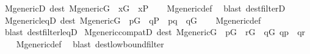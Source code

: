 \begin{isabellebody}
\isanewline
{}\isamarkupfalse%
\ M{\isacharunderscore}{\kern0pt}genericD\ {\isacharbrackleft}{\kern0pt}dest{\isacharbrackright}{\kern0pt}{\isacharcolon}{\kern0pt}\ {\isachardoublequoteopen}M{\isacharunderscore}{\kern0pt}generic{\isacharparenleft}{\kern0pt}G{\isacharparenright}{\kern0pt}\ {\isasymLongrightarrow}\ x{\isasymin}G\ {\isasymLongrightarrow}\ x{\isasymin}P{\isachardoublequoteclose}\isanewline
%
\isadelimproof
\ \ %
\endisadelimproof
%
\isatagproof
{}\isamarkupfalse%
\ M{\isacharunderscore}{\kern0pt}generic{\isacharunderscore}{\kern0pt}def\ \isamarkupfalse%
\ {\isacharparenleft}{\kern0pt}blast\ dest{\isacharcolon}{\kern0pt}filterD{\isacharparenright}{\kern0pt}%
\endisatagproof
{\isafoldproof}%
%
\isadelimproof
\isanewline
%
\endisadelimproof
\isanewline
{}\isamarkupfalse%
\ M{\isacharunderscore}{\kern0pt}generic{\isacharunderscore}{\kern0pt}leqD\ {\isacharbrackleft}{\kern0pt}dest{\isacharbrackright}{\kern0pt}{\isacharcolon}{\kern0pt}\ {\isachardoublequoteopen}M{\isacharunderscore}{\kern0pt}generic{\isacharparenleft}{\kern0pt}G{\isacharparenright}{\kern0pt}\ {\isasymLongrightarrow}\ p{\isasymin}G\ {\isasymLongrightarrow}\ q{\isasymin}P\ {\isasymLongrightarrow}\ p{\isasympreceq}q\ {\isasymLongrightarrow}\ q{\isasymin}G{\isachardoublequoteclose}\isanewline
%
\isadelimproof
\ \ %
\endisadelimproof
%
\isatagproof
{}\isamarkupfalse%
\ M{\isacharunderscore}{\kern0pt}generic{\isacharunderscore}{\kern0pt}def\ \isamarkupfalse%
\ {\isacharparenleft}{\kern0pt}blast\ dest{\isacharcolon}{\kern0pt}filter{\isacharunderscore}{\kern0pt}leqD{\isacharparenright}{\kern0pt}%
\endisatagproof
{\isafoldproof}%
%
\isadelimproof
\isanewline
%
\endisadelimproof
\isanewline
{}\isamarkupfalse%
\ M{\isacharunderscore}{\kern0pt}generic{\isacharunderscore}{\kern0pt}compatD\ {\isacharbrackleft}{\kern0pt}dest{\isacharbrackright}{\kern0pt}{\isacharcolon}{\kern0pt}\ {\isachardoublequoteopen}M{\isacharunderscore}{\kern0pt}generic{\isacharparenleft}{\kern0pt}G{\isacharparenright}{\kern0pt}\ {\isasymLongrightarrow}\ p{\isasymin}G\ {\isasymLongrightarrow}\ r{\isasymin}G\ {\isasymLongrightarrow}\ {\isasymexists}q{\isasymin}G{\isachardot}{\kern0pt}\ q{\isasympreceq}p\ {\isasymand}\ q{\isasympreceq}r{\isachardoublequoteclose}\isanewline
%
\isadelimproof
\ \ %
\endisadelimproof
%
\isatagproof
{}\isamarkupfalse%
\ M{\isacharunderscore}{\kern0pt}generic{\isacharunderscore}{\kern0pt}def\ \isamarkupfalse%
\ {\isacharparenleft}{\kern0pt}blast\ dest{\isacharcolon}{\kern0pt}low{\isacharunderscore}{\kern0pt}bound{\isacharunderscore}{\kern0pt}filter{\isacharparenright}{\kern0pt}%

\end{isabellebody}
